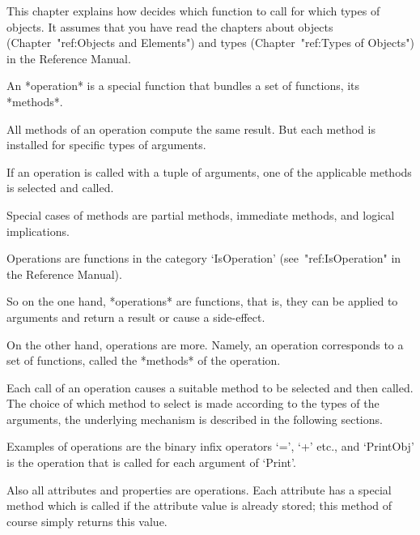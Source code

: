

This chapter explains how {\GAP} decides which function to call for which
types of objects.
It assumes that you have read the chapters about objects
(Chapter~"ref:Objects and Elements") and types (Chapter~"ref:Types of Objects")
in the Reference Manual.

An *operation* is a special {\GAP} function that bundles a set of
functions, its *methods*.

All methods of an operation compute the same result.
But each method is installed for specific types of arguments.

If an operation is called with a tuple of arguments,
one of the applicable methods is selected and called.

Special cases of methods are partial methods, immediate methods,
and logical implications.


Operations are functions in the category `IsOperation'
(see~"ref:IsOperation" in the Reference Manual).

So on the one hand, *operations* are {\GAP} functions, that is,
they can be applied to arguments and return a result or cause a
side-effect.

On the other hand, operations are more.
Namely, an operation corresponds to a set of {\GAP} functions,
called the *methods* of the operation.

Each call of an operation causes a suitable method to be selected
and then called.
The choice of which method to select is made according to the types
of the arguments,
the underlying mechanism is described in the following sections.

Examples of operations are the binary infix operators `=', `+' etc.,
and `PrintObj' is the operation that is called for each argument of
`Print'.

Also all attributes and properties are operations.
Each attribute has a special method which is called
if the attribute value is already stored;
this method of course simply returns this value.

